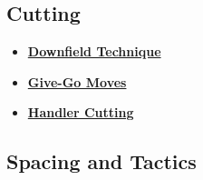\subsection*{Cutting}
\begin{itemize}
    \item \textcolor{blue}{\textbf{\href{https://www.youtube.com/watch?v=CqpPfVZ1HeI}{Downfield Technique}}}
    \item \textcolor{blue}{\textbf{\href{https://www.youtube.com/watch?v=25XZBaQJxDo}{Give-Go Moves}}}
    \item \textcolor{blue}{\textbf{\href{https://www.youtube.com/watch?v=OUg1O5XNVmQ}{Handler Cutting}}}
\end{itemize}
\subsection*{Spacing and Tactics}
